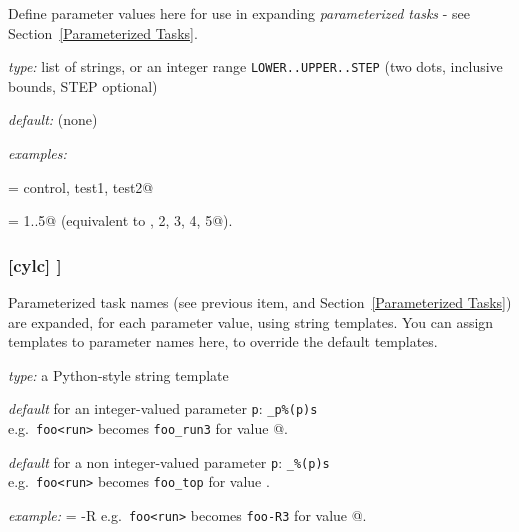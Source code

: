 Define parameter values here for use in expanding {\em parameterized tasks} -
see Section~\ref{Parameterized Tasks}.
\begin{myitemize}
    \item {\em type:} list of strings, or an integer range
        \lstinline=LOWER..UPPER..STEP= (two dots, inclusive bounds, STEP optional)
    \item {\em default:} (none)
    \item {\em examples:}
        \begin{myitemize}
            \item \lstinline@run = control, test1, test2@
            \item \lstinline@mem = 1..5@  (equivalent to , 2, 3, 4, 5@).
        \end{myitemize}
\end{myitemize}

\subsubsection[{[[}parameter templates{]]}]{[cylc] \textrightarrow [[parameter templates]]}
\label{RefParameterTemplates}

Parameterized task names (see previous item, and Section~\ref{Parameterized
Tasks}) are expanded, for each parameter value, using string templates.  You
can assign templates to parameter names here, to override the default templates.

\begin{myitemize}
    \item {\em type:} a Python-style string template
    \item {\em default} for an integer-valued parameter \lstinline=p=:
        \lstinline=_p%(p)s= \\
        e.g.\ \lstinline=foo<run>= becomes \lstinline=foo_run3= for
            \lstinline@run@ value @.
    \item {\em default} for a non integer-valued parameter \lstinline=p=:
        \lstinline=_%(p)s= \\
        e.g.\ \lstinline=foo<run>= becomes \lstinline=foo_top= for
            \lstinline@run@ value \lstinline@top@.
    \item {\em example:} \lstinline@run = -R%(run)s@ \\
            e.g.\ \lstinline=foo<run>= becomes \lstinline=foo-R3= for
            \lstinline@run@ value @.
\end{myitemize}

